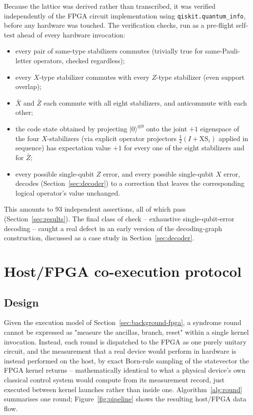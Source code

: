 \documentclass[pdflatex,sn-mathphys,Numbered]{sn-jnl}
\begin{document}
Because the lattice was derived rather than transcribed, it was verified independently of the FPGA circuit implementation using \texttt{qiskit.quantum\_info}, before any hardware was touched. The verification checks, run as a pre-flight self-test ahead of every hardware invocation:
\begin{itemize}
\item every pair of same-type stabilizers commutes (trivially true for same-Pauli-letter operators, checked regardless);
\item every $X$-type stabilizer commutes with every $Z$-type stabilizer (even support overlap);
\item $\bar X$ and $\bar Z$ each commute with all eight stabilizers, and anticommute with each other;
\item the code state obtained by projecting $\lvert 0\rangle^{\otimes 9}$ onto the joint $+1$ eigenspace of the four $X$-stabilizers (via explicit operator projectors $\tfrac12(I+\mathrm{XS}_i)$ applied in sequence) has expectation value $+1$ for every one of the eight stabilizers and for $\bar Z$;
\item every possible single-qubit $Z$ error, and every possible single-qubit $X$ error, decodes (Section~\ref{sec:decoder}) to a correction that leaves the corresponding logical operator's value unchanged.
\end{itemize}
This amounts to 93 independent assertions, all of which pass (Section~\ref{sec:results}). The final class of check -- exhaustive single-qubit-error decoding -- caught a real defect in an early version of the decoding-graph construction, discussed as a case study in Section~\ref{sec:decoder}.

\section{Host/FPGA co-execution protocol}\label{sec:protocol}

\subsection{Design}

Given the execution model of Section~\ref{sec:background-fpga}, a syndrome round cannot be expressed as "measure the ancillas, branch, reset" within a single kernel invocation. Instead, each round is dispatched to the FPGA as one purely unitary circuit, and the measurement that a real device would perform in hardware is instead performed on the host, by exact Born-rule sampling of the statevector the FPGA kernel returns -- mathematically identical to what a physical device's own classical control system would compute from its measurement record, just executed between kernel launches rather than inside one. Algorithm~\ref{alg:round} summarises one round; Figure~\ref{fig:pipeline} shows the resulting host/FPGA data flow.
\end{document}
